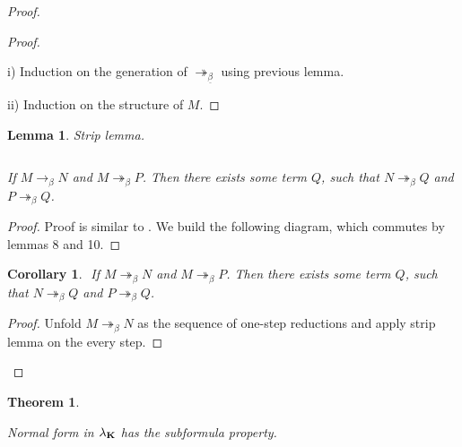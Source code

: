 \documentclass[a4paper]{article}
\newtheorem{theorem}{Theorem}
\newtheorem{lemma}{Lemma}
\newtheorem{col}{Corollary}
\begin{document}
\begin{proof}
\begin{proof}
  $ $

  i) Induction on the generation of $\twoheadrightarrow_{\underline{\beta}}$ using previous lemma.

  ii) Induction on the structure of $M$.
\end{proof}

\begin{lemma} Strip lemma.

$ $

If $M \rightarrow_{\beta} N$ and $M \twoheadrightarrow_{\beta} P$. Then there exists some term $Q$, such that
$N \twoheadrightarrow_{\beta} Q$ and $P \twoheadrightarrow_{\beta} Q$.
\end{lemma}

\begin{proof}

Proof is similar to \cite{Baren} \cite{Baren2}. We build the following diagram, which commutes by lemmas 8 and 10.

\vspace{\baselineskip}

\end{proof}

\begin{col}
$ $
If $M \twoheadrightarrow_{\beta} N$ and $M \twoheadrightarrow_{\beta} P$. Then there exists some term $Q$, such that
$N \twoheadrightarrow_{\beta} Q$ and $P \twoheadrightarrow_{\beta} Q$.
\end{col}

\begin{proof}

  Unfold $M \twoheadrightarrow_{\beta} N$ as the sequence of one-step reductions and apply strip lemma on the every step.
\end{proof}

\end{proof}

\begin{theorem}
  $ $

  Normal form in $\lambda_{{\bf K}}$ has the subformula property.

\end{theorem}
\end{document}
